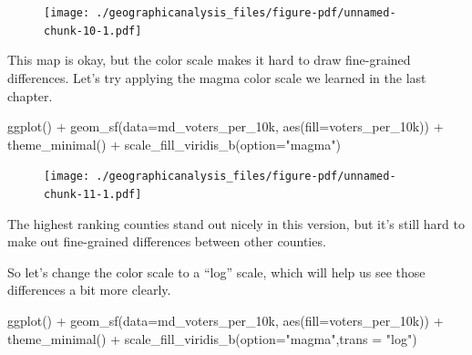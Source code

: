 \documentclass[
  letterpaper,
  DIV=11,
  numbers=noendperiod]{scrreprt}
\newenvironment{Shaded}{\begin{snugshade}}{\end{snugshade}}
\newcommand{\AttributeTok}[1]{\textcolor[rgb]{0.40,0.45,0.13}{#1}}
\newcommand{\FunctionTok}[1]{\textcolor[rgb]{0.28,0.35,0.67}{#1}}
\newcommand{\NormalTok}[1]{\textcolor[rgb]{0.00,0.23,0.31}{#1}}
\newcommand{\SpecialCharTok}[1]{\textcolor[rgb]{0.37,0.37,0.37}{#1}}
\newcommand{\StringTok}[1]{\textcolor[rgb]{0.13,0.47,0.30}{#1}}
\begin{document}
\begin{figure}[H]

{\centering \texttt{[image: ./geographicanalysis\_files/figure-pdf/unnamed-chunk-10-1.pdf]}

}

\end{figure}

This map is okay, but the color scale makes it hard to draw fine-grained
differences. Let's try applying the magma color scale we learned in the
last chapter.

\begin{Shaded}
\begin{Highlighting}[]
\FunctionTok{ggplot}\NormalTok{() }\SpecialCharTok{+}
  \FunctionTok{geom\_sf}\NormalTok{(}\AttributeTok{data=}\NormalTok{md\_voters\_per\_10k, }\FunctionTok{aes}\NormalTok{(}\AttributeTok{fill=}\NormalTok{voters\_per\_10k)) }\SpecialCharTok{+}
  \FunctionTok{theme\_minimal}\NormalTok{() }\SpecialCharTok{+}
  \FunctionTok{scale\_fill\_viridis\_b}\NormalTok{(}\AttributeTok{option=}\StringTok{"magma"}\NormalTok{)}
\end{Highlighting}
\end{Shaded}

\begin{figure}[H]

{\centering \texttt{[image: ./geographicanalysis\_files/figure-pdf/unnamed-chunk-11-1.pdf]}

}

\end{figure}

The highest ranking counties stand out nicely in this version, but it's
still hard to make out fine-grained differences between other counties.

So let's change the color scale to a ``log'' scale, which will help us
see those differences a bit more clearly.

\begin{Shaded}
\begin{Highlighting}[]
\FunctionTok{ggplot}\NormalTok{() }\SpecialCharTok{+}
  \FunctionTok{geom\_sf}\NormalTok{(}\AttributeTok{data=}\NormalTok{md\_voters\_per\_10k, }\FunctionTok{aes}\NormalTok{(}\AttributeTok{fill=}\NormalTok{voters\_per\_10k)) }\SpecialCharTok{+}
  \FunctionTok{theme\_minimal}\NormalTok{() }\SpecialCharTok{+}
  \FunctionTok{scale\_fill\_viridis\_b}\NormalTok{(}\AttributeTok{option=}\StringTok{"magma"}\NormalTok{,}\AttributeTok{trans =} \StringTok{"log"}\NormalTok{)}
\end{Highlighting}
\end{Shaded}
\end{document}

